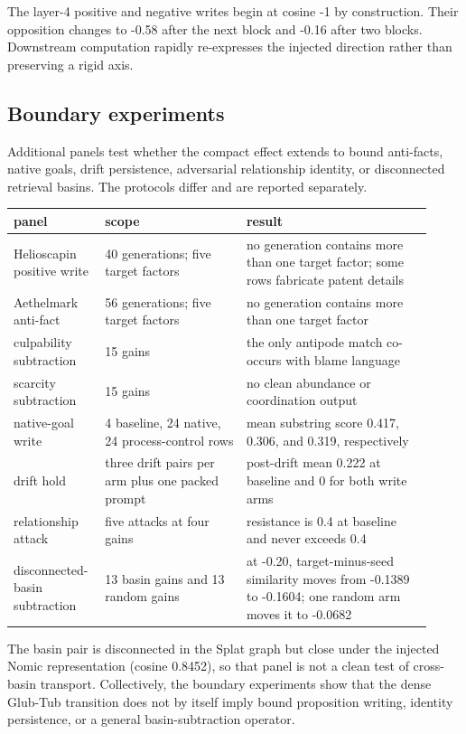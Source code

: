\documentclass[11pt]{article}
\begin{document}
The layer-4 positive and negative writes begin at cosine -1 by construction.
Their opposition changes to -0.58 after the next block and -0.16 after two
blocks. Downstream computation rapidly re-expresses the injected direction
rather than preserving a rigid axis.

\subsection{Boundary experiments}


Additional panels test whether the compact effect extends to bound anti-facts,
native goals, drift persistence, adversarial relationship identity, or
disconnected retrieval basins. The protocols differ and are reported
separately.

\begin{center}
\small
\begin{tabular}{p{0.18\linewidth}p{0.32\linewidth}p{0.42\linewidth}}
\toprule
panel & scope & result \\
\midrule
Helioscapin positive write & 40 generations; five target factors & no generation contains more than one target factor; some rows fabricate patent details \\
Aethelmark anti-fact & 56 generations; five target factors & no generation contains more than one target factor \\
culpability subtraction & 15 gains & the only antipode match co-occurs with blame language \\
scarcity subtraction & 15 gains & no clean abundance or coordination output \\
native-goal write & 4 baseline, 24 native, 24 process-control rows & mean substring score 0.417, 0.306, and 0.319, respectively \\
drift hold & three drift pairs per arm plus one packed prompt & post-drift mean 0.222 at baseline and 0 for both write arms \\
relationship attack & five attacks at four gains & resistance is 0.4 at baseline and never exceeds 0.4 \\
disconnected-basin subtraction & 13 basin gains and 13 random gains & at -0.20, target-minus-seed similarity moves from -0.1389 to -0.1604; one random arm moves it to -0.0682 \\
\bottomrule
\end{tabular}
\end{center}


The basin pair is disconnected in the Splat graph but close under the injected
Nomic representation (cosine 0.8452), so that panel is not a clean test of
cross-basin transport. Collectively, the boundary experiments show that the
dense Glub-Tub transition does not by itself imply bound proposition writing,
identity persistence, or a general basin-subtraction operator.
\end{document}
